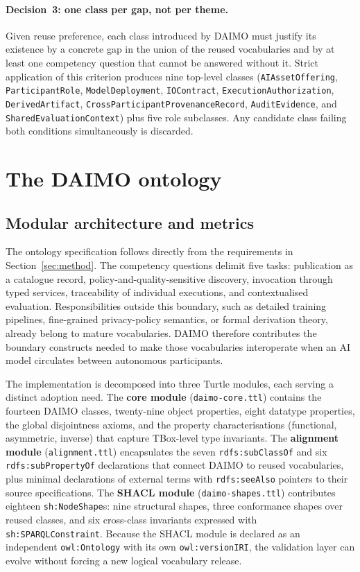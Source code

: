 \documentclass[11pt,a4paper]{article}
\newcommand{\code}[1]{\texttt{#1}}
\begin{document}
\paragraph{Decision~3: one class per gap, not per theme.} Given reuse preference, each class introduced by DAIMO must justify its existence by a concrete gap in the union of the reused vocabularies and by at least one competency question that cannot be answered without it. Strict application of this criterion produces nine top-level classes (\code{AIAssetOffering}, \code{ParticipantRole}, \code{ModelDeployment}, \code{IOContract}, \code{ExecutionAuthorization}, \code{DerivedArtifact}, \code{CrossParticipantProvenanceRecord}, \code{AuditEvidence}, and \code{SharedEvaluationContext}) plus five role subclasses. Any candidate class failing both conditions simultaneously is discarded.

\section{The DAIMO ontology}\label{sec:ontology}

\subsection{Modular architecture and metrics}\label{sec:scope}

The ontology specification follows directly from the requirements in Section~\ref{sec:method}. The competency questions delimit five tasks: publication as a catalogue record, policy-and-quality-sensitive discovery, invocation through typed services, traceability of individual executions, and contextualised evaluation. Responsibilities outside this boundary, such as detailed training pipelines, fine-grained privacy-policy semantics, or formal derivation theory, already belong to mature vocabularies. DAIMO therefore contributes the boundary constructs needed to make those vocabularies interoperate when an AI model circulates between autonomous participants.

The implementation is decomposed into three Turtle modules, each serving a distinct adoption need. The \textbf{core module} (\code{daimo-core.ttl}) contains the fourteen DAIMO classes, twenty-nine object properties, eight datatype properties, the global disjointness axioms, and the property characterisations (functional, asymmetric, inverse) that capture TBox-level type invariants. The \textbf{alignment module} (\code{alignment.ttl}) encapsulates the seven \code{rdfs:subClassOf} and six \code{rdfs:subPropertyOf} declarations that connect DAIMO to reused vocabularies, plus minimal declarations of external terms with \code{rdfs:seeAlso} pointers to their source specifications. The \textbf{SHACL module} (\code{daimo-shapes.ttl}) contributes eighteen \code{sh:NodeShape}s: nine structural shapes, three conformance shapes over reused classes, and six cross-class invariants expressed with \code{sh:SPARQLConstraint}. Because the SHACL module is declared as an independent \code{owl:Ontology} with its own \code{owl:versionIRI}, the validation layer can evolve without forcing a new logical vocabulary release.
\end{document}
